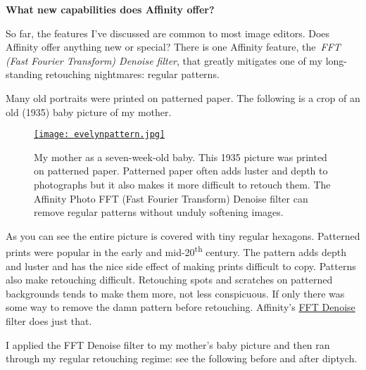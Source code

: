 
\medskip
\noindent\textbf{What new capabilities does Affinity offer?}
\medskip

So far, the features I've discussed are common to most image editors.
Does Affinity offer anything new or special? There is one Affinity
feature, the~\emph{FFT (Fast Fourier Transform) Denoise filter}, that
greatly mitigates one of my long-standing retouching nightmares: regular
patterns.

Many old portraits were printed on patterned paper. The following is a
crop of an old (1935) baby picture of my mother.



\begin{figure}
\centering
\href{https://bakerjd99.files.wordpress.com/2017/01/evelynpattern.jpg}{\texttt{[image: evelynpattern.jpg]}}
\caption{My mother as a seven-week-old baby. This 1935 picture was printed on
patterned paper. Patterned paper often adds luster and depth to
photographs but it also makes it more difficult to retouch them. The
Affinity Photo FFT (Fast Fourier Transform) Denoise filter can remove
regular patterns without unduly softening images.}
\label{fig:5317X2}
\end{figure}



As you can see the entire picture is covered with tiny regular hexagons.
Patterned prints were popular in the early and
mid-20\textsuperscript{th} century. The pattern adds depth and luster
and has the nice side effect of making prints difficult to copy.
Patterns also make retouching difficult. Retouching spots and scratches
on patterned backgrounds tends to make them more, not less conspicuous.
If only there was some way to remove the damn pattern before retouching.
Affinity's \href{https://vimeo.com/161180581}{FFT Denoise} filter does
just that.

I applied the FFT Denoise filter to my mother's baby picture and then
ran through my regular retouching regime: see the following before and
after diptych.




